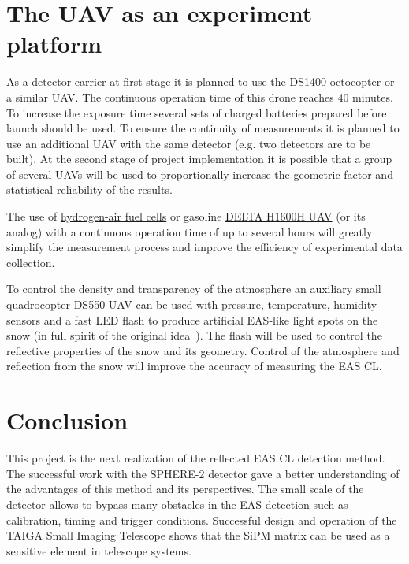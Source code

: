 \documentclass[a4paper,11pt]{article}
\begin{document}
\section{The UAV as an experiment platform}

As a detector carrier at first stage it is planned to use the \href{https://dronestroy.ru/catalog/copters/oktokopter-ds1400/}{DS1400 octocopter} or a similar UAV.
The continuous operation time of this drone reaches 40 minutes.
To increase the exposure time several sets of charged batteries prepared before launch should be used. 
To ensure the continuity of measurements it is planned to use an additional UAV with the same detector (e.g. two detectors are to be built).
At the second stage of project implementation it is possible that a group of several UAVs will be used to proportionally increase the geometric factor and statistical reliability of the results. 

The use of \href{http://atenergy.pro/en/products/energoobespechenie-bpla.html}{hydrogen-air fuel cells} or gasoline \href{http://r7dron.ru/}{DELTA H1600H UAV} (or its analog) with a continuous operation time of up to several hours will greatly simplify the measurement process and improve the efficiency of experimental data collection.

To control the density and transparency of the atmosphere an auxiliary small \href{https://dronestroy.ru/catalog/copters/kvadrokopter-ds550/}{quadrocopter DS550} UAV can be used with pressure, temperature, humidity sensors and a fast LED flash to produce artificial EAS-like light spots on the snow (in full spirit of the original idea~\cite{Chu74}).
The flash will be used to control the reflective properties of the snow and its geometry. Control of the atmosphere and reflection from the snow will improve the accuracy of measuring the EAS CL.

\section{Conclusion}

This project is the next realization of the reflected EAS CL detection method. The successful work with the SPHERE-2 detector gave a better understanding of the advantages of this method and its perspectives. The small scale of the detector allows to bypass many obstacles in the EAS detection such as calibration, timing and trigger conditions. Successful design and operation of the TAIGA Small Imaging Telescope shows that the SiPM matrix can be used as a sensitive element in telescope systems.
\end{document}
